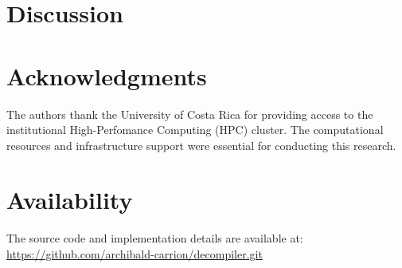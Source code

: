 \documentclass[conference]{IEEEtran} %
\begin{document}


\section{Discussion} \label{discussion}



\section{Acknowledgments} \label{acknowledgments}

The authors thank the University of Costa Rica for providing access to the institutional
High-Perfomance Computing (HPC) cluster. The computational resources and infrastructure
support were essential for conducting this research.

\section{Availability} \label{availability}

The source code and implementation details are available at: \\
\url{https://github.com/archibald-carrion/decompiler.git}

\printbibliography[title={References}]
\end{document}

